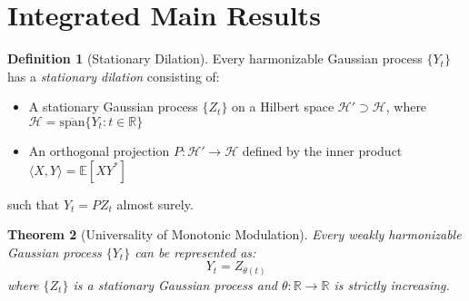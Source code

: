 \documentclass{article}
\theoremstyle{plain}
\newtheorem{theorem}{Theorem}
\theoremstyle{definition}
\newtheorem{definition}[theorem]{Definition}
\begin{document}
\section{Integrated Main Results}

\begin{definition}[Stationary Dilation]
Every harmonizable Gaussian process $\{Y_t\}$ has a \emph{stationary dilation} consisting of:
\begin{itemize}
\item A stationary Gaussian process $\{Z_t\}$ on a Hilbert space $\mathcal{H}' \supset \mathcal{H}$, where $\mathcal{H} = \overline{\text{span}}\{Y_t : t \in \mathbb{R}\}$
\item An orthogonal projection $P: \mathcal{H}' \to \mathcal{H}$ defined by the inner product $\langle X, Y \rangle = \mathbb{E}[XY^*]$
\end{itemize}
such that $Y_t = PZ_t$ almost surely.
\end{definition}

\begin{theorem}[Universality of Monotonic Modulation]
Every weakly harmonizable Gaussian process $\{Y_t\}$ can be represented as:
\begin{equation}
Y_t = Z_{\theta(t)}
\end{equation}
where $\{Z_t\}$ is a stationary Gaussian process and $\theta:\mathbb{R}\to\mathbb{R}$ is strictly increasing.
\end{theorem}
\end{document}
